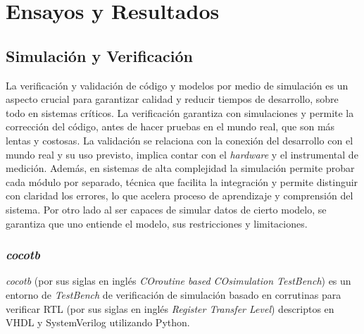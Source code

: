 \chapter{Ensayos y Resultados}
\label{Chapter4}


\section{Simulación y Verificación}

La verificación y validación de código y modelos por medio de simulación es
un aspecto crucial para garantizar calidad y reducir tiempos de desarrollo,
sobre todo en sistemas críticos. La verificación garantiza con simulaciones y
permite la corrección del código, antes de hacer pruebas en el mundo real, que
son más lentas y costosas. La validación se relaciona con la conexión del
desarrollo con el mundo real y su uso previsto, implica contar con el
\textit{hardware} y el instrumental de medición. Además, en sistemas de alta
complejidad la simulación permite probar cada módulo por separado, técnica que
facilita la integración y permite distinguir con claridad los errores, lo que
acelera proceso de aprendizaje y comprensión del sistema. Por otro lado al ser
capaces de simular datos de cierto modelo, se garantiza que uno entiende el
modelo, sus restricciones y limitaciones.


\subsection{\textit{cocotb}}
\textit{cocotb} (por sus siglas en inglés \textit{COroutine based COsimulation
TestBench}) es un entorno de \textit{TestBench} de verificación de simulación
basado en corrutinas para verificar RTL (por sus siglas en inglés
\textit{Register Transfer Level}) descriptos en VHDL y SystemVerilog utilizando
Python.


